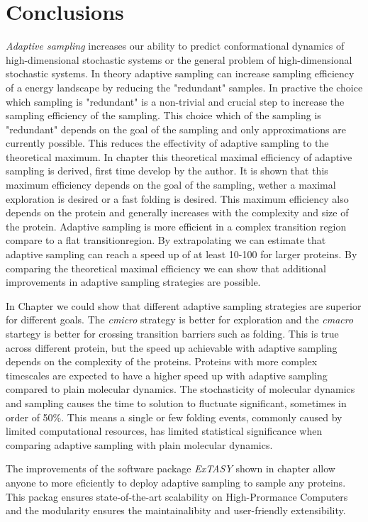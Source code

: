 
\chapter{Conclusions}

\emph{Adaptive sampling} increases our ability to predict conformational dynamics of high-dimensional stochastic systems or the general problem of high-dimensional stochastic systems. 
In theory adaptive sampling can increase sampling efficiency of a energy landscape by reducing the "redundant" samples. In practive the choice which sampling is "redundant" is a non-trivial and crucial step to increase the sampling efficiency of the sampling. This choice which of the sampling is "redundant" depends on the goal of the sampling and only approximations are currently possible. This reduces the effectivity of adaptive sampling to the theoretical maximum. 
In chapter \label{ch:chapter3} this theoretical maximal efficiency of adaptive sampling is derived, first time develop by the author. It is shown that this maximum efficiency depends on the goal of the sampling, wether a maximal exploration is desired or a fast folding is desired. This maximum efficiency also depends on the protein and generally increases with the complexity and size of the protein. Adaptive sampling is more efficient in a complex transition region compare to a flat transitionregion. By extrapolating we can estimate that adaptive sampling can reach a speed up of at least 10-100 for larger proteins. By comparing the theoretical maximal efficiency we can show that additional improvements in adaptive sampling strategies are possible.

In Chapter \label{ch:chapter32} we could show that different adaptive sampling strategies are superior for different goals. The \emph{cmicro} strategy is better for exploration and the \emph{cmacro} startegy is better for crossing transition barriers such as folding. This is true across different protein, but the speed up achievable with adaptive sampling depends on the complexity of the proteins. Proteins with more complex timescales are expected to have a higher speed up with adaptive sampling compared to plain molecular dynamics. The stochasticity of molecular dynamics and sampling causes the time to solution to fluctuate significant, sometimes in order of 50\%. This means a single or few folding events, commonly caused by limited computational resources, has limited statistical significance when comparing adaptive sampling with plain molecular dynamics.

The improvements of the software package \emph{ExTASY} shown in chapter \label{ch:chapter4} allow anyone to more eficiently to deploy adaptive sampling to sample any proteins. This packag ensures state-of-the-art scalability on High-Prormance Computers and the modularity ensures the maintainalibity and user-friendly extensibility.

